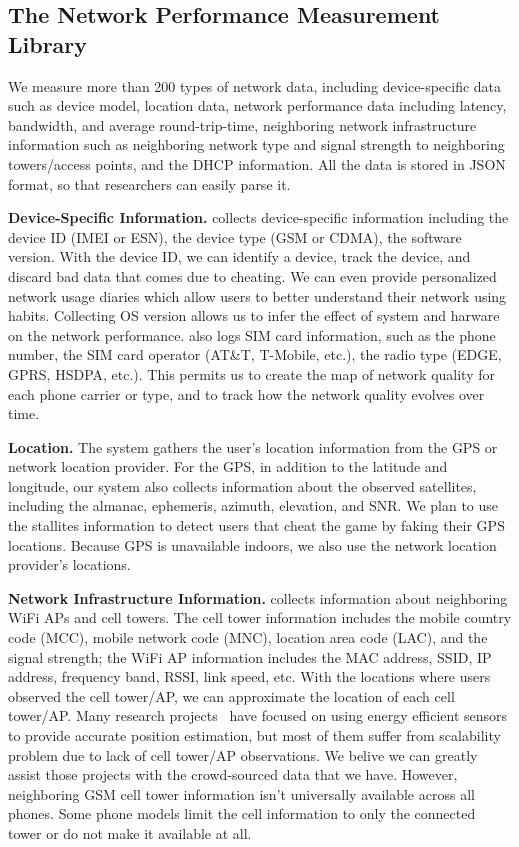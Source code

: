 \subsection{The Network Performance Measurement Library}
\label{ss:measurements}
We measure more than 200 types of network data, including device-specific data such as device model, 
location data, network performance data including latency, bandwidth, and average round-trip-time, 
neighboring network infrastructure information such as neighboring network type and signal strength to 
neighboring towers/access points, and the DHCP information. All the data is stored in JSON format, so
that researchers can easily parse it.


{\bfseries Device-Specific Information.} \name{} collects device-specific information including the device ID 
(IMEI or ESN), the device type (GSM or CDMA), the software version. With the device ID, we can 
identify a device, track the device, and discard bad data that comes due to cheating. We can 
even provide personalized network usage diaries which allow users to better understand their network 
using habits.
Collecting OS version allows us to infer the effect of system and harware on the network performance. \name{} also 
logs SIM card information, such as the phone number, the SIM card operator (AT\&T, T-Mobile, etc.),
the radio type (EDGE, GPRS, HSDPA, etc.).
This permits us to create the map of network quality for each phone carrier or type, and to track how the network quality 
evolves over time.

{\bfseries Location.} The system gathers the user's location information from the GPS or network location provider. 
For the GPS, in addition to the latitude and longitude, our system also collects information 
about the observed satellites, including the almanac, ephemeris, azimuth, elevation, and SNR.
We plan to use the stallites information to detect users that cheat the game by faking their GPS locations.
Because GPS is unavailable indoors, we also use the network location provider's locations.


{\bfseries Network Infrastructure Information.} \name{} collects information about
neighboring WiFi APs and cell towers. The cell tower information includes the mobile country code (MCC), 
mobile network code (MNC), location area code (LAC), and the signal strength; the WiFi AP information
includes the MAC address, SSID, IP address, frequency band, RSSI, link speed, etc.
With the locations where users observed the cell tower/AP, we can approximate the location of 
each cell tower/AP. Many research projects~\cite{ctrack, vtrack-sensys09} have focused on using 
energy efficient sensors to provide accurate position estimation, but most of them suffer from scalability
problem due to lack of cell tower/AP observations. We belive we can greatly assist those projects
with the crowd-sourced data that we have. However, neighboring GSM cell tower information isn't 
universally available across all phones. Some phone models limit the cell information to only 
the connected tower or do not make it available at all.

